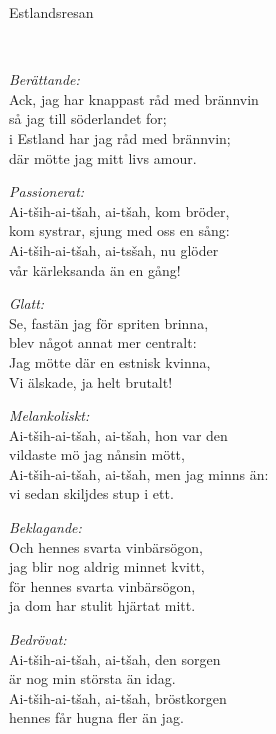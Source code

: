 \begin{song}{Estlandsresan}
	
	\\
	
	
	\; \emph{ Berättande:}\\
	Ack, jag har knappast råd med brännvin\\
	så jag till söderlandet for;\\
	i Estland har jag råd med brännvin;\\
	där mötte jag mitt livs amour.
	
	\vspace{-.1cm}
	\; \emph{ Passionerat:}	\\
	Ai-tših-ai-tšah, ai-tšah, kom bröder,\\
	kom systrar, sjung med oss en sång:\\
	Ai-tših-ai-tšah, ai-tsšah, nu glöder\\
	vår kärleksanda än en gång!
	
	\vspace{.1cm}
	\; \emph{ Glatt:}\\
	Se, fastän jag för spriten brinna,\\
	blev något annat mer centralt:\\
	Jag mötte där en estnisk kvinna,\\
	Vi älskade, ja helt brutalt!

	\vspace{-.1cm}
	\; \emph{ Melankoliskt:}\\
	Ai-tših-ai-tšah, ai-tšah, hon var den\\
	vildaste mö jag nånsin mött,\\
	Ai-tših-ai-tšah, ai-tšah, men jag minns än:\\
	vi sedan skiljdes stup i ett.

	\vspace{.1cm}
	\; \emph{ Beklagande:}\\
	Och hennes svarta vinbärsögon,\\
	jag blir nog aldrig minnet kvitt,\\
	för hennes svarta vinbärsögon,\\
	ja dom har stulit hjärtat mitt.
	
	\vspace{-.1cm}
	\; \emph{ Bedrövat:}\\
	Ai-tših-ai-tšah, ai-tšah, den sorgen\\
	är nog min största än idag.\\
	Ai-tših-ai-tšah, ai-tšah, bröstkorgen\\
	hennes får hugna fler än jag.


\end{song}
